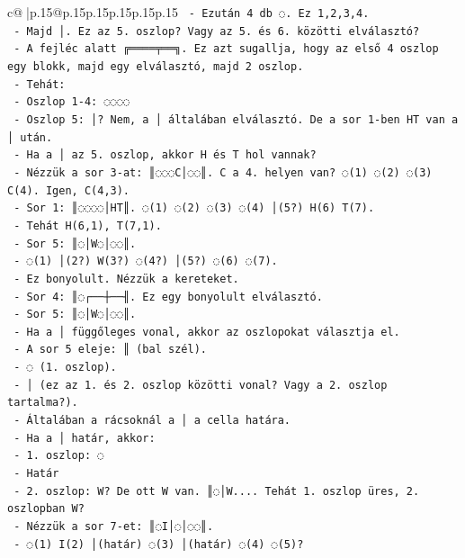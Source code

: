 \documentclass{article}
\begin{document}
{\begin{supertabular}{c@{$\;$}|p{.15\linewidth}@{}p{.15\linewidth}p{.15\linewidth}p{.15\linewidth}p{.15\linewidth}p{.15\linewidth}}
{{{\texttt{    {-} Ezután 4 db ◌. Ez 1,2,3,4.} \\
\texttt{    {-} Majd │. Ez az 5. oszlop? Vagy az 5. és 6. közötti elválasztó?} \\
\texttt{    {-} A fejléc alatt ╔════╤══╗. Ez azt sugallja, hogy az első 4 oszlop egy blokk, majd egy elválasztó, majd 2 oszlop.} \\
\texttt{    {-} Tehát:} \\
\texttt{      {-} Oszlop 1{-}4: ◌◌◌◌} \\
\texttt{      {-} Oszlop 5: │? Nem, a │ általában elválasztó. De a sor 1{-}ben HT van a │ után.} \\
\texttt{      {-} Ha a │ az 5. oszlop, akkor H és T hol vannak?} \\
\texttt{      {-} Nézzük a sor 3{-}at: ║◌◌◌C│◌◌║. C a 4. helyen van? ◌(1) ◌(2) ◌(3) C(4). Igen, C(4,3).} \\
\texttt{      {-} Sor 1: ║◌◌◌◌│HT║. ◌(1) ◌(2) ◌(3) ◌(4) │(5?) H(6) T(7).} \\
\texttt{      {-} Tehát H(6,1), T(7,1).} \\
\texttt{    {-} Sor 5: ║◌│W◌│◌◌║.} \\
\texttt{      {-} ◌(1) │(2?) W(3?) ◌(4?) │(5?) ◌(6) ◌(7).} \\
\texttt{      {-} Ez bonyolult. Nézzük a kereteket.} \\
\texttt{      {-} Sor 4: ║◌┌──┼──╢. Ez egy bonyolult elválasztó.} \\
\texttt{      {-} Sor 5: ║◌│W◌│◌◌║.} \\
\texttt{      {-} Ha a │ függőleges vonal, akkor az oszlopokat választja el.} \\
\texttt{      {-} A sor 5 eleje: ║ (bal szél).} \\
\texttt{      {-} ◌ (1. oszlop).} \\
\texttt{      {-} │ (ez az 1. és 2. oszlop közötti vonal? Vagy a 2. oszlop tartalma?).} \\
\texttt{      {-} Általában a rácsoknál a │ a cella határa.} \\
\texttt{      {-} Ha a │ határ, akkor:} \\
\texttt{        {-} 1. oszlop: ◌} \\
\texttt{        {-} Határ} \\
\texttt{        {-} 2. oszlop: W? De ott W van. ║◌│W.... Tehát 1. oszlop üres, 2. oszlopban W?} \\
\texttt{        {-} Nézzük a sor 7{-}et: ║◌I│◌│◌◌║.} \\
\texttt{        {-} ◌(1) I(2) │(határ) ◌(3) │(határ) ◌(4) ◌(5)?} \\
}}}
\end{supertabular}}
\end{document}
